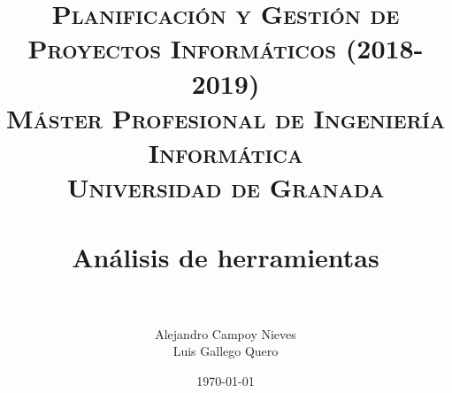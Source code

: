 

\title{	
	\normalfont \normalsize 
	\textsc{\textbf{Planificación y Gestión de Proyectos Informáticos (2018-2019)} \\ Máster Profesional de Ingeniería Informática \\ Universidad de Granada} \\ [25pt] %
	\horrule{0.5pt} \\[0.4cm] %
	\huge Análisis de herramientas \\ %
	\horrule{2pt} \\[0.5cm] %
}

\author{Alejandro Campoy Nieves \\ Luis Gallego Quero} %
\date{\normalsize\today} %

\usepackage[spanish, es-tabla]{babel}
\usepackage{hyperref} %
\hypersetup{
	colorlinks=true,
	linkcolor=blue,
	filecolor=magenta,      
	urlcolor=blue,
}
\usepackage{graphicx}
\usepackage{amssymb, amsmath, amsbsy}
\usepackage{mathptmx}	
\usepackage{float}
\usepackage{booktabs}					%
\usepackage{eurosym}

\usepackage[table]{xcolor}
\usepackage{color}
\usepackage{colortbl}
\usepackage{multicol}
\usepackage{multirow}
\usepackage{booktabs}
\usepackage{tabularx}
\usepackage{array}
\usepackage{caption}
\usepackage{subcaption}




	\maketitle %
	
	\newpage %
	
	\tableofcontents %
	
	
